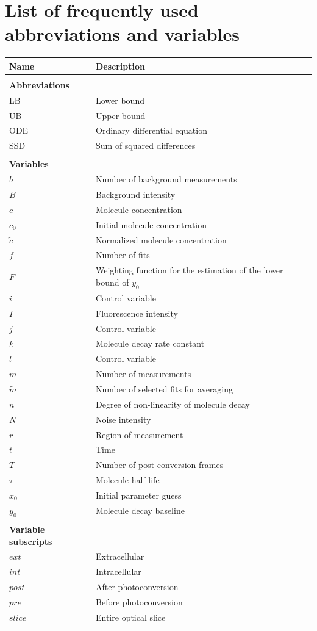 \documentclass[a4paper,11pt]{article}
\begin{document}
\section{List of frequently used abbreviations and variables}
\begin{tabular}{lll} 
\\
\toprule
\textbf{Name} & \textbf{Description}\\
\midrule
\\
\textbf{Abbreviations}\\
LB & Lower bound\\
UB & Upper bound\\
ODE & Ordinary differential equation\\
SSD & Sum of squared differences\\
\\
\textbf{Variables}\\
$b$ & Number of background measurements \\
$B$ & Background intensity \\
$c$ & Molecule concentration\\
$c_0$ & Initial molecule concentration \\
$\tilde{c}$ & Normalized molecule concentration \\
$f$ & Number of fits \\
$F$ & Weighting function for the estimation of the lower bound of $y_0$ \\
$i$ & Control variable \\
$I$ & Fluorescence intensity \\
$j$ & Control variable \\
$k$ & Molecule decay rate constant \\
$l$ & Control variable \\
$m$ & Number of measurements \\
$\tilde{m}$ & Number of selected fits for averaging \\
$n$ & Degree of non-linearity of molecule decay \\
$N$ & Noise intensity \\
$r$ & Region of measurement \\
$t$ & Time \\
$T$ & Number of post-conversion frames \\
$\tau$ & Molecule half-life \\
$x_0$ & Initial parameter guess\\
$y_0$ & Molecule decay baseline \\
\\
\textbf{Variable subscripts}\\
$ext$ & Extracellular\\
$int$ & Intracellular\\
$post$ & After photoconversion\\
$pre$ & Before photoconversion\\
$slice$ & Entire optical slice\\
\bottomrule
\end{tabular}

\pagebreak



\end{document}
